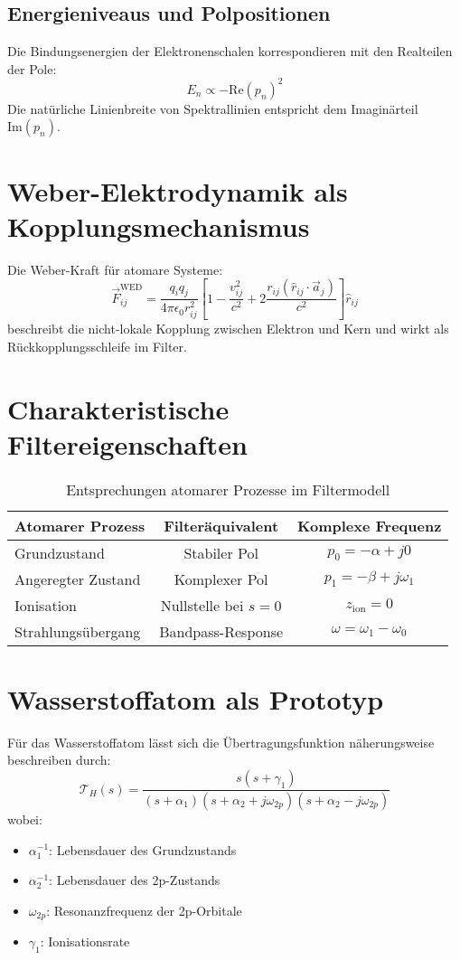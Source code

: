 \subsection{Energieniveaus und Polpositionen}
Die Bindungsenergien der Elektronenschalen korrespondieren mit den Realteilen der Pole:
\[
E_n \propto -\text{Re}(p_n)^2
\]
Die natürliche Linienbreite von Spektrallinien entspricht dem Imaginärteil $\text{Im}(p_n)$.

\section{Weber-Elektrodynamik als Kopplungsmechanismus}

Die Weber-Kraft für atomare Systeme:
\[
\vec{F}_{ij}^{\text{WED}} = \frac{q_i q_j}{4\pi\epsilon_0 r_{ij}^2}\left[1 - \frac{v_{ij}^2}{c^2} + 2\frac{r_{ij}(\hat{r}_{ij}\cdot\vec{a}_j)}{c^2}\right]\hat{r}_{ij}
\]
beschreibt die nicht-lokale Kopplung zwischen Elektron und Kern und wirkt als Rückkopplungsschleife im Filter.

\section{Charakteristische Filtereigenschaften}

\begin{table}[ht]
\centering
\begin{tabular}{lcc}
\hline
Atomarer Prozess & Filteräquivalent & Komplexe Frequenz \\
\hline
Grundzustand & Stabiler Pol & $p_0 = -\alpha + j0$ \\
Angeregter Zustand & Komplexer Pol & $p_1 = -\beta + j\omega_1$ \\
Ionisation & Nullstelle bei $s = 0$ & $z_{\text{ion}} = 0$ \\
Strahlungsübergang & Bandpass-Response & $\omega = \omega_1 - \omega_0$ \\
\hline
\end{tabular}
\caption{Entsprechungen atomarer Prozesse im Filtermodell}
\end{table}

\section{Wasserstoffatom als Prototyp}

Für das Wasserstoffatom lässt sich die Übertragungsfunktion näherungsweise beschreiben durch:
\[
\mathcal{T}_H(s) = \frac{s(s + \gamma_1)}{(s + \alpha_1)(s + \alpha_2 + j\omega_{2p})(s + \alpha_2 - j\omega_{2p})}
\]
wobei:
\begin{itemize}
\item $\alpha_1^{-1}$: Lebensdauer des Grundzustands
\item $\alpha_2^{-1}$: Lebensdauer des 2p-Zustands
\item $\omega_{2p}$: Resonanzfrequenz der 2p-Orbitale
\item $\gamma_1$: Ionisationsrate
\end{itemize}

